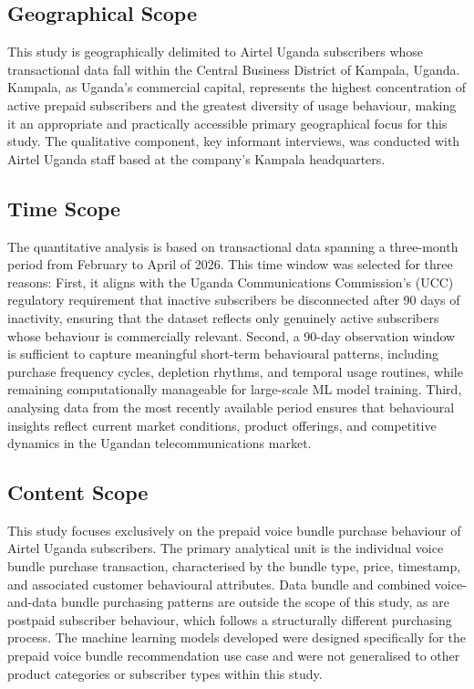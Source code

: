 \subsection{Geographical Scope}

This study is geographically delimited to Airtel Uganda subscribers whose transactional data fall within the Central Business District of Kampala, Uganda. Kampala, as Uganda's commercial capital, represents the highest concentration of active prepaid subscribers and the greatest diversity of usage behaviour, making it an appropriate and practically accessible primary geographical focus for this study. The qualitative component, key informant interviews, was conducted with Airtel Uganda staff based at the company's Kampala headquarters.


\subsection{Time Scope}

The quantitative analysis is based on transactional data spanning a three-month period from February to April of 2026. This time window was selected for three reasons: First, it aligns with the Uganda Communications Commission's (UCC) regulatory requirement that inactive subscribers be disconnected after 90 days of inactivity, ensuring that the dataset reflects only genuinely active subscribers whose behaviour is commercially relevant. Second, a 90-day observation window is sufficient to capture meaningful short-term behavioural patterns, including purchase frequency cycles, depletion rhythms, and temporal usage routines, while remaining computationally manageable for large-scale ML model training. Third, analysing data from the most recently available period ensures that behavioural insights reflect current market conditions, product offerings, and competitive dynamics in the Ugandan telecommunications market.


\subsection{Content Scope}

This study focuses exclusively on the prepaid voice bundle purchase behaviour of Airtel Uganda subscribers. The primary analytical unit is the individual voice bundle purchase transaction, characterised by the bundle type, price, timestamp, and associated customer behavioural attributes. Data bundle and combined voice-and-data bundle purchasing patterns are outside the scope of this study, as are postpaid subscriber behaviour, which follows a structurally different purchasing process. The machine learning models developed were designed specifically for the prepaid voice bundle recommendation use case and were not generalised to other product categories or subscriber types within this study.


